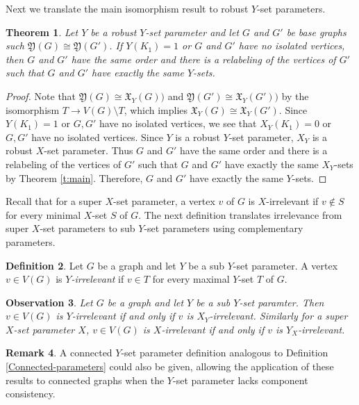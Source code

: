 \documentclass{article}
\numberwithin{figure}{section}
\numberwithin{table}{section}
\numberwithin{equation}{section}
\newtheorem{thm}{Theorem}[section]
\newtheorem{obs}[thm]{Observation}
\theoremstyle{definition}
\newtheorem{rem}[thm]{Remark}
\theoremstyle{definition}
\newtheorem{defn}[thm]{Definition}
\theoremstyle{definition}
\newcommand{\bpf}{\begin{proof}}
\newcommand{\epf}{\end{proof}\ms}
\newcommand{\ms}{\medskip}
\newcommand{\xytar}{{\mathfrak X}_Y}
\newcommand{\ytar}{\mathfrak{Y}}
\begin{document}
{%
Next we %
 translate  the main  isomorphism result to robust $Y$-set parameters.  
 
\begin{thm}\label{t:main-comp} 
Let $Y$ be a robust $Y$-set parameter and let $G$ and $G'$ be base graphs such $\ytar(G)\cong\ytar(G')$. If $Y(K_1)=1$ or $G$ and $G'$ have no isolated vertices, then $G$ and $G'$ have the same order and there is a relabeling of the vertices of $G'$ such that $G$ and $G'$ have exactly the same $Y$-sets.  
\end{thm}
\bpf Note that $\ytar(G)\cong \xytar(G))$ and $\ytar(G')\cong \xytar(G'))$ by the isomorphism $T\to V(G)\setminus T$, which implies $\xytar(G)\cong \xytar(G')$.
Since
$Y(K_1)=1$ or $G,G'$ have no isolated vertices, we see that
$X_Y(K_1)=0$ or $G,G'$ have no isolated vertices.
Since $Y$ is a robust $Y$-set parameter, $X_Y$ is a robust $X$-set parameter.  Thus $G$ and $G'$ have the same order and there is a relabeling of the vertices of $G'$ such that $G$ and $G'$ have exactly the same $X_Y$-sets by  Theorem \ref{t:main}.  Therefore, $G$ and $G'$ have exactly the same $Y$-sets.
\epf


Recall that for a super $X$-set parameter, a vertex $v$ of $G$ is $X$-irrelevant if $v\not\in S $ for every minimal $X$-set $S$ of $G$. The next definition translates irrelevance  from super $X$-set parameters to sub $Y$-set parameters using complementary parameters.
 
 \begin{defn}
     Let $G$ be a graph and let $Y$ be a sub $Y$-set parameter.  A vertex  $v\in  V(G)$ is \emph{$Y$-irrelevant}  if $v\in T $ for every maximal $Y$-set $T$ of $G$.
 \end{defn}



\begin{obs}
Let $G$ be a graph and let $Y$ be a sub $Y$-set paramter. Then $v \in V(G)$ is $Y$-irrelevant if and only if $v$ is $X_Y$-irrelevant. Similarly for a super $X$-set parameter $X$, $v \in V(G)$ is $X$-irrelevant if and only if $v$ is $Y_X$-irrelevant.
\end{obs}

 \begin{rem}
A connected $Y$-set parameter definition analogous to Definition \ref{Connected-parameters} could also be given, allowing the application of these results to connected graphs when the $Y$-set parameter lacks component consistency.    
\end{rem}

}
\end{document}
